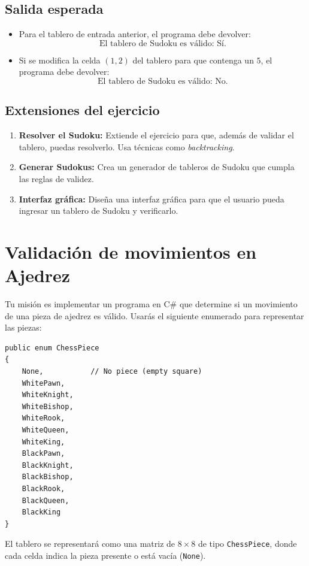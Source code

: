\subsection*{Salida esperada}

\begin{itemize}
    \item Para el tablero de entrada anterior, el programa debe devolver:
    \[
    \text{El tablero de Sudoku es válido: Sí.}
    \]
    \item Si se modifica la celda \((1,2)\) del tablero para que contenga un \(5\), el programa debe devolver:
    \[
    \text{El tablero de Sudoku es válido: No.}
    \]
\end{itemize}

\subsection*{Extensiones del ejercicio}
\begin{enumerate}
    \item \textbf{Resolver el Sudoku:} Extiende el ejercicio para que, además de validar el tablero, puedas resolverlo. Usa técnicas como \textit{backtracking}.
    \item \textbf{Generar Sudokus:} Crea un generador de tableros de Sudoku que cumpla las reglas de validez.
    \item \textbf{Interfaz gráfica:} Diseña una interfaz gráfica para que el usuario pueda ingresar un tablero de Sudoku y verificarlo.
\end{enumerate}

\section{Validación de movimientos en Ajedrez}

Tu misión es implementar un programa en C\# que determine si un movimiento de una pieza de ajedrez es válido. Usarás el siguiente enumerado para representar las piezas:

\begin{lstlisting}[caption=Enumeración para las piezas de ajedrez]
public enum ChessPiece
{
    None,           // No piece (empty square)
    WhitePawn,
    WhiteKnight,
    WhiteBishop,
    WhiteRook,
    WhiteQueen,
    WhiteKing,
    BlackPawn,
    BlackKnight,
    BlackBishop,
    BlackRook,
    BlackQueen,
    BlackKing
}
\end{lstlisting}

El tablero se representará como una matriz de \(8 \times 8\) de tipo \texttt{ChessPiece}, donde cada celda indica la pieza presente o está vacía (\texttt{None}).

